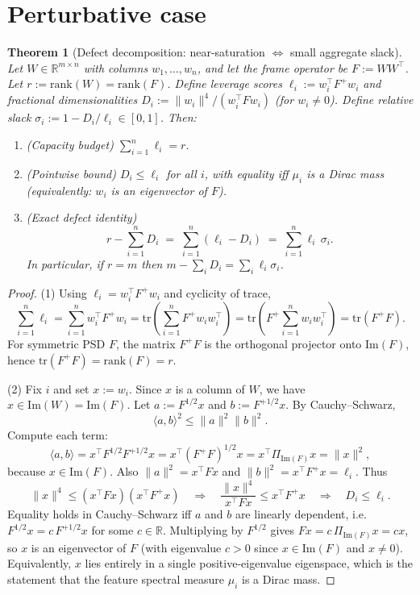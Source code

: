 \documentclass{article}
\theoremstyle{plain}
\newtheorem{theorem}{Theorem}
\numberwithin{equation}{section}
\theoremstyle{definition}
\theoremstyle{remark}
\begin{document}
\section{Perturbative case} \label{section:perturbative_analysis}
\begin{lemmaproofbox}
\begin{theorem}[Defect decomposition: near-saturation $\Leftrightarrow$ small aggregate slack]\label{thm:defect-decomposition}
Let $W\in\mathbb{R}^{m\times n}$ with columns $w_1,\dots,w_n$, and let the frame operator be $F:=WW^\top$.
Let $r:=\mathrm{rank}(W)=\mathrm{rank}(F)$. Define leverage scores $\ell_i := w_i^\top F^{+} w_i$ and fractional
dimensionalities $D_i := \|w_i\|^4/(w_i^\top F w_i)$ (for $w_i\neq 0$). Define relative slack
$\sigma_i := 1 - D_i/\ell_i\in[0,1]$. Then:
\begin{enumerate}
\item (\emph{Capacity budget}) $\sum_{i=1}^n \ell_i = r$.
\item (\emph{Pointwise bound}) $D_i \le \ell_i$ for all $i$, with equality iff $\mu_i$ is a Dirac mass
(equivalently: $w_i$ is an eigenvector of $F$).
\item (\emph{Exact defect identity})
\[
r - \sum_{i=1}^n D_i
\;=\;
\sum_{i=1}^n (\ell_i - D_i)
\;=\;
\sum_{i=1}^n \ell_i\,\sigma_i.
\]
In particular, if $r=m$ then $m-\sum_i D_i=\sum_i \ell_i\sigma_i$.
\end{enumerate}
\end{theorem}

\begin{proof}
(1) Using $\ell_i = w_i^\top F^+ w_i$ and cyclicity of trace,
\[
\sum_{i=1}^n \ell_i
= \sum_{i=1}^n w_i^\top F^+ w_i
= \mathrm{tr}\!\left(\sum_{i=1}^n F^+ w_i w_i^\top\right)
= \mathrm{tr}\!\left(F^+ \sum_{i=1}^n w_i w_i^\top\right)
= \mathrm{tr}(F^+ F).
\]
For symmetric PSD $F$, the matrix $F^+F$ is the orthogonal projector onto $\mathrm{Im}(F)$, hence
$\mathrm{tr}(F^+F)=\mathrm{rank}(F)=r$.

(2) Fix $i$ and set $x:=w_i$. Since $x$ is a column of $W$, we have $x\in \mathrm{Im}(W)=\mathrm{Im}(F)$.
Let $a:=F^{1/2}x$ and $b:=F^{+1/2}x$. By Cauchy--Schwarz,
\[
\langle a,b\rangle^2 \le \|a\|^2\|b\|^2.
\]
Compute each term:
\[
\langle a,b\rangle
= x^\top F^{1/2}F^{+1/2}x
= x^\top (F^+F)^{1/2} x
= x^\top \Pi_{\mathrm{Im}(F)} x
= \|x\|^2,
\]
because $x\in\mathrm{Im}(F)$. Also $\|a\|^2=x^\top F x$ and $\|b\|^2=x^\top F^+ x=\ell_i$.
Thus
\[
\|x\|^4 \le (x^\top F x)(x^\top F^+ x)
\quad\Longrightarrow\quad
\frac{\|x\|^4}{x^\top F x} \le x^\top F^+ x
\quad\Longrightarrow\quad
D_i \le \ell_i.
\]
Equality holds in Cauchy--Schwarz iff $a$ and $b$ are linearly dependent, i.e.
$F^{1/2}x = c\,F^{+1/2}x$ for some $c\in\mathbb{R}$.
Multiplying by $F^{1/2}$ gives $Fx = c\,\Pi_{\mathrm{Im}(F)}x = c x$, so $x$ is an eigenvector of $F$
(with eigenvalue $c>0$ since $x\in\mathrm{Im}(F)$ and $x\neq 0$).
Equivalently, $x$ lies entirely in a single positive-eigenvalue eigenspace, which is the statement that the feature spectral measure $\mu_i$ is a Dirac mass.


\end{proof}
\end{lemmaproofbox}
\end{document}

